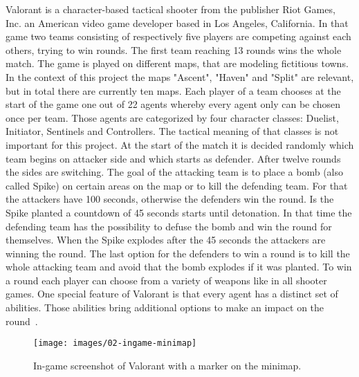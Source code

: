 Valorant is a character-based tactical shooter from the publisher Riot Games, Inc. an American 
video game developer based in Los Angeles, California. In that game two teams consisting of 
respectively five players are competing against each others, trying to win rounds. The first team 
reaching 13 rounds wins the whole match. The game is played on different maps, that are modeling
fictitious towns. In the context of this project the maps "Ascent", "Haven" and "Split" are relevant, 
but in total there are currently ten maps. Each player of a team chooses at the start of the game one 
out of 22 agents whereby every agent only can be chosen once per team. Those agents are 
categorized by four character classes: Duelist, Initiator, Sentinels and Controllers. The tactical 
meaning of that classes is not important for this project. At the start of the match it is decided 
randomly which team begins on attacker side and which starts as defender. After twelve rounds the 
sides are switching. The goal of the attacking team is to place a bomb (also called Spike) on certain 
areas on the map or to kill the defending team. For that the attackers have 100 seconds, otherwise 
the defenders win the round. Is the Spike planted a countdown of 45 seconds starts until detonation. 
In that time the defending team has the possibility to defuse the bomb and win the round for 
themselves. When the Spike explodes after the 45 seconds the attackers are winning the round. The 
last option for the defenders to win a round is to kill the whole attacking team and avoid that the 
bomb explodes if it was planted. To win a round each player can choose from a variety of 
weapons like in all shooter games. One special feature of Valorant is that every agent has a distinct 
set of abilities. Those abilities bring additional options to make an impact on the 
round~\cite{riotgames-valorant, spike2023, unrated2023}.

\begin{figure}
	\centering
	\texttt{[image: images/02-ingame-minimap]}
	\caption[In-game screenshot of Valorant]{In-game screenshot of Valorant with a marker on the 
	minimap.}
	\label{fig:intro:ingame}
\end{figure}

